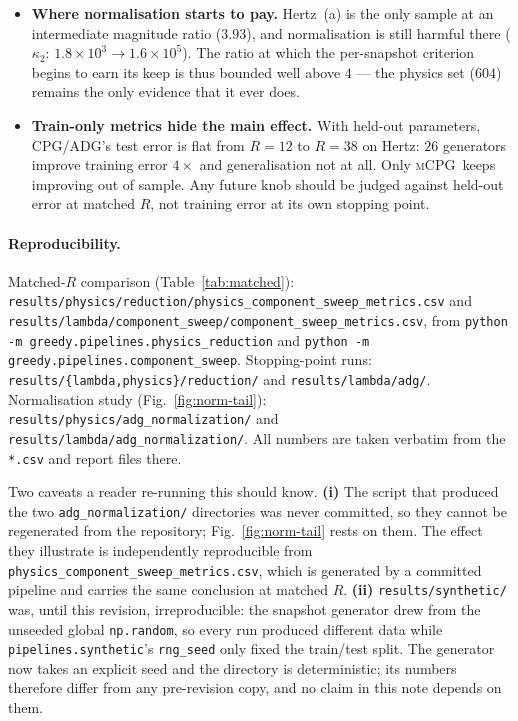 \documentclass[11pt]{article}
\newcommand{\CPG}{\textsc{CPG}}
\newcommand{\ADG}{\textsc{ADG}}
\newcommand{\mCPG}{\textsc{mCPG}}
\begin{document}
\begin{itemize}
        worse --- held-out choice at the same $R=4$. Plain \ADG\ ties or loses to
        \CPG\ on every dataset tested; it never wins.
  \item \textbf{Where normalisation starts to pay.} Hertz~(a) is the only sample
        at an intermediate magnitude ratio ($3.93$), and normalisation is still
        harmful there ($\kappa_2$: $1.8\times10^{3}\to1.6\times10^{5}$). The
        ratio at which the per-snapshot criterion begins to earn its keep is thus
        bounded well above $4$ --- the physics set ($604$) remains the only
        evidence that it ever does.
  \item \textbf{Train-only metrics hide the main effect.} With held-out
        parameters, \CPG/\ADG's test error is flat from $R=12$ to $R=38$ on Hertz:
        $26$ generators improve training error $4\times$ and generalisation not at
        all. Only \mCPG\ keeps improving out of sample. Any future knob should be
        judged against held-out error at matched $R$, not training error at its
        own stopping point.
\end{itemize}

\paragraph{Reproducibility.}
Matched-$R$ comparison (Table~\ref{tab:matched}):
\texttt{results/physics/reduction/physics\_component\_sweep\_metrics.csv} and
\texttt{results/lambda/component\_sweep/component\_sweep\_metrics.csv}, from
\texttt{python -m greedy.pipelines.physics\_reduction} and
\texttt{python -m greedy.pipelines.component\_sweep}. Stopping-point runs:
\texttt{results/\{lambda,physics\}/reduction/} and \texttt{results/lambda/adg/}.
Normalisation study (Fig.~\ref{fig:norm-tail}):
\texttt{results/physics/adg\_normalization/} and
\texttt{results/lambda/adg\_normalization/}. All numbers are taken verbatim from
the \texttt{*.csv} and report files there.

Two caveats a reader re-running this should know. \textbf{(i)} The script that
produced the two \texttt{adg\_normalization/} directories was never committed, so
they cannot be regenerated from the repository; Fig.~\ref{fig:norm-tail} rests on
them. The effect they illustrate is independently reproducible from
\texttt{physics\_component\_sweep\_metrics.csv}, which is generated by a committed
pipeline and carries the same conclusion at matched $R$.
\textbf{(ii)} \texttt{results/synthetic/} was, until this revision,
irreproducible: the snapshot generator drew from the unseeded global
\texttt{np.random}, so every run produced different data while
\texttt{pipelines.synthetic}'s \texttt{rng\_seed} only fixed the train/test split.
The generator now takes an explicit seed and the directory is deterministic; its
numbers therefore differ from any pre-revision copy, and no claim in this note
depends on them.
\end{document}
